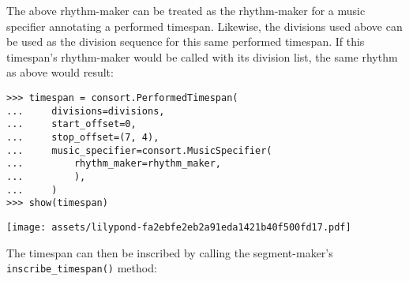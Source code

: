\noindent The above rhythm-maker can be treated as the rhythm-maker for a music
specifier annotating a performed timespan. Likewise, the divisions used above
can be used as the division sequence for this same performed timespan. If this
timespan's rhythm-maker would be called with its division list, the same rhythm
as above would result:

\begin{comment}
<abjad>
timespan = consort.PerformedTimespan(
    divisions=divisions,
    start_offset=0,
    stop_offset=(7, 4),
    music_specifier=consort.MusicSpecifier(
        rhythm_maker=rhythm_maker,
        ),
    )
show(timespan)
</abjad>
\end{comment}

\begin{abjadbookoutput}
\begin{singlespacing}
\vspace{-0.5\baselineskip}
\begin{verbatim}
>>> timespan = consort.PerformedTimespan(
...     divisions=divisions,
...     start_offset=0,
...     stop_offset=(7, 4),
...     music_specifier=consort.MusicSpecifier(
...         rhythm_maker=rhythm_maker,
...         ),
...     )
>>> show(timespan)
\end{verbatim}
\noindent\texttt{[image: assets/lilypond-fa2ebfe2eb2a91eda1421b40f500fd17.pdf]}
\end{singlespacing}
\end{abjadbookoutput}

\noindent The timespan can then be inscribed by calling the segment-maker's
\texttt{inscribe\_timespan()} method:

\begin{comment}
<abjad>
inscribed_timespans = consort.SegmentMaker.inscribe_timespan(timespan)
show(inscribed_timespans, range_=(0, (7, 4)))
print(format(inscribed_timespans))
</abjad>
\end{comment}

